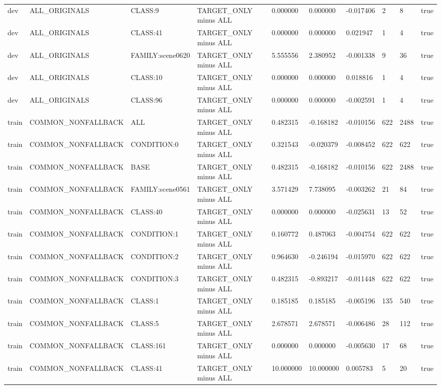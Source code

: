 \begin{tabular}{llllllllll}
dev & ALL\_ORIGINALS & CLASS:9 & TARGET\_ONLY minus ALL & 0.000000 & 0.000000 & -0.017406 & 2 & 8 & true \\
dev & ALL\_ORIGINALS & CLASS:41 & TARGET\_ONLY minus ALL & 0.000000 & 0.000000 & 0.021947 & 1 & 4 & true \\
dev & ALL\_ORIGINALS & FAMILY:scene0620 & TARGET\_ONLY minus ALL & 5.555556 & 2.380952 & -0.001338 & 9 & 36 & true \\
dev & ALL\_ORIGINALS & CLASS:10 & TARGET\_ONLY minus ALL & 0.000000 & 0.000000 & 0.018816 & 1 & 4 & true \\
dev & ALL\_ORIGINALS & CLASS:96 & TARGET\_ONLY minus ALL & 0.000000 & 0.000000 & -0.002591 & 1 & 4 & true \\
train & COMMON\_NONFALLBACK & ALL & TARGET\_ONLY minus ALL & 0.482315 & -0.168182 & -0.010156 & 622 & 2488 & true \\
train & COMMON\_NONFALLBACK & CONDITION:0 & TARGET\_ONLY minus ALL & 0.321543 & -0.020379 & -0.008452 & 622 & 622 & true \\
train & COMMON\_NONFALLBACK & BASE & TARGET\_ONLY minus ALL & 0.482315 & -0.168182 & -0.010156 & 622 & 2488 & true \\
train & COMMON\_NONFALLBACK & FAMILY:scene0561 & TARGET\_ONLY minus ALL & 3.571429 & 7.738095 & -0.003262 & 21 & 84 & true \\
train & COMMON\_NONFALLBACK & CLASS:40 & TARGET\_ONLY minus ALL & 0.000000 & 0.000000 & -0.025631 & 13 & 52 & true \\
train & COMMON\_NONFALLBACK & CONDITION:1 & TARGET\_ONLY minus ALL & 0.160772 & 0.487063 & -0.004754 & 622 & 622 & true \\
train & COMMON\_NONFALLBACK & CONDITION:2 & TARGET\_ONLY minus ALL & 0.964630 & -0.246194 & -0.015970 & 622 & 622 & true \\
train & COMMON\_NONFALLBACK & CONDITION:3 & TARGET\_ONLY minus ALL & 0.482315 & -0.893217 & -0.011448 & 622 & 622 & true \\
train & COMMON\_NONFALLBACK & CLASS:1 & TARGET\_ONLY minus ALL & 0.185185 & 0.185185 & -0.005196 & 135 & 540 & true \\
train & COMMON\_NONFALLBACK & CLASS:5 & TARGET\_ONLY minus ALL & 2.678571 & 2.678571 & -0.006486 & 28 & 112 & true \\
train & COMMON\_NONFALLBACK & CLASS:161 & TARGET\_ONLY minus ALL & 0.000000 & 0.000000 & -0.005630 & 17 & 68 & true \\
train & COMMON\_NONFALLBACK & CLASS:41 & TARGET\_ONLY minus ALL & 10.000000 & 10.000000 & 0.005783 & 5 & 20 & true \\

\end{tabular}
